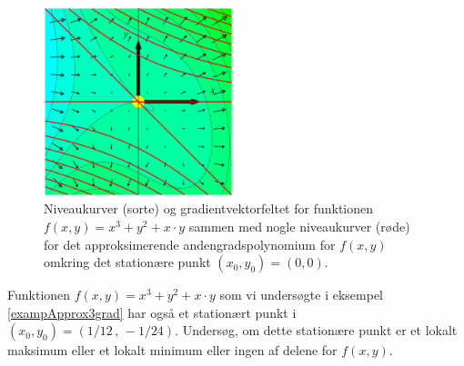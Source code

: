 \begin{figure}[ht]
\centerline{ \includegraphics[height=55mm]{plotGrad3.pdf}}
\begin{center}
\caption{Niveaukurver (sorte) og gradientvektorfeltet for funktionen $f(x,y)= x^{3} + y^{2} + x\cdot y$ sammen med nogle niveaukurver (røde) for det approksimerende an\-dengrads\-polynomium for $f(x,y)$ omkring det stationære punkt $(x_{0}, y_{0}) = (0,0)$.} \label{figPosHessNiv3}
\end{center}
\end{figure}



\begin{exercise}
Funktionen $f(x,y) = x^{3} + y^{2} + x\cdot y$ som vi undersøgte i eksempel \ref{exampApprox3grad} har også et stationært punkt i $(x_{0}, y_{0}) = (1/12\, , \, -1/24)$. Undersøg, om dette stationære punkt er et lokalt maksimum eller et lokalt minimum eller ingen af delene for $f(x,y)$.
\end{exercise}


